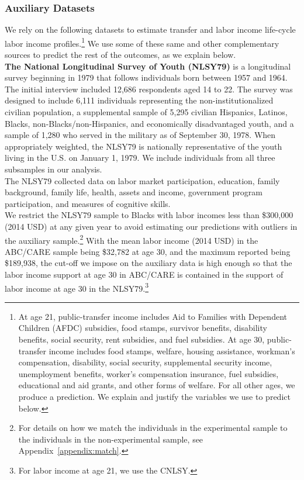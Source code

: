 \subsubsection{Auxiliary Datasets} \label{app:datasets}

\noindent We rely on the following datasets to estimate transfer and labor income life-cycle labor income profiles.\footnote{At age 21, public-transfer income includes Aid to Families with Dependent Children (AFDC) subsidies, food stamps, survivor benefits, disability benefits, social security, rent subsidies, and fuel subsidies. At age 30, public-transfer income includes food stamps, welfare, housing assistance, workman's compensation, disability, social security, supplemental security income, unemployment benefits, worker's compensation insurance, fuel subsidies, educational and aid grants, and other forms of welfare. For all other ages, we produce a prediction. We explain and justify the variables we use to predict below.} We use some of these same and other complementary sources to predict the rest of the outcomes, as we explain below.\\

\noindent\textbf{The National Longitudinal Survey of Youth (NLSY79)} is a longitudinal survey beginning in 1979 that follows individuals born between 1957 and 1964. The initial interview included 12,686 respondents aged 14 to 22. The survey was designed to include 6,111 individuals representing the non-institutionalized civilian population, a supplemental sample of 5,295 civilian Hispanics, Latinos, Blacks, non-Blacks/non-Hispanics, and economically disadvantaged youth, and a sample of 1,280 who served in the military as of September 30, 1978. When appropriately weighted, the NLSY79 is nationally representative of the youth living in the U.S. on January 1, 1979. We include individuals from all three subsamples in our analysis.\\

\noindent The NLSY79 collected data on labor market participation, education, family background, family life, health, assets and income, government program participation, and measures of cognitive skills.\\

\noindent We restrict the NLSY79 sample to Blacks with labor incomes less than \$300,000 (2014 USD) at any given year to avoid estimating our predictions with outliers in the auxiliary sample.\footnote{For details on how we match the individuals in the experimental sample to the individuals in the non-experimental sample, see Appendix~\ref{appendix:match}.} With the mean labor income (2014 USD) in the ABC/CARE sample being \$32,782 at age 30, and the maximum reported being \$189,938, the cut-off we impose on the auxiliary data is high enough so that the labor income support at age 30 in ABC/CARE is contained in the support of labor income at age 30 in the NLSY79.\footnote{For labor income at age 21, we use the CNLSY.}\\

